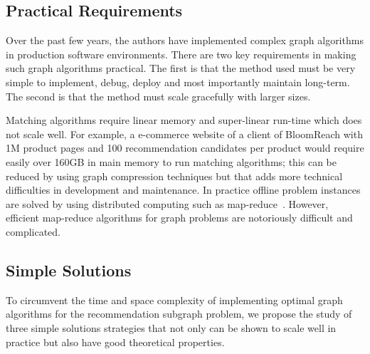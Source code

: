 \subsection{Practical Requirements}

Over the past few years, the authors have implemented complex graph algorithms in production software environments.
There are two key requirements in making such graph algorithms
practical. The first is that the method used must be very simple to
implement, debug, deploy and most importantly maintain long-term. The second is that the method must scale
gracefully with larger sizes. \vs

Matching algorithms require linear memory and super-linear run-time
which does not scale well. For example, a
e-commerce website of a client of BloomReach with 1M product pages and 100 recommendation candidates per
product would require easily over 160GB in main memory to run matching
algorithms; this can be reduced by using graph compression techniques but that adds more technical difficulties in development and maintenance. In practice offline problem instances are solved by using distributed computing such as map-reduce~\cite{DeanGhemawat2004}. However, efficient map-reduce algorithms for graph problems are notoriously difficult and complicated. \vs

\subsection{Simple Solutions}

To circumvent the time and space complexity of implementing optimal graph algorithms for the recommendation subgraph problem, we propose the study of three simple solutions strategies that not only can be shown to scale well in practice but
also have good theoretical properties.

